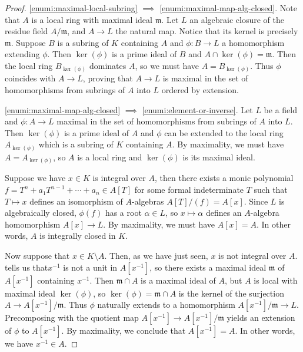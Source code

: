 \begin{proof}
\ref{enumi:maximal-local-subring} $\implies$ \ref{enumi:maximal-map-alg-closed}. Note that $A$ is a local ring with maximal ideal $\mathfrak{m}$. Let $L$ an algebraic closure of the residue field $A/\mathfrak{m}$, and $A \to L$ the natural map. Notice that its kernel is precisely $\mathfrak{m}$. Suppose $B$ is a subring of $K$ containing $A$ and $\phi : B \to L$ a homomorphism extending $\phi$. Then $\ker(\phi)$ is a prime ideal of $B$ and $A \cap \ker(\phi) = \mathfrak{m}$. Then the local ring $B_{\ker(\phi)}$ dominates $A$, so we must have $A = B_{\ker(\phi)}$. Thus $\phi$ coincides with $A \to L$, proving that $A \to L$ is maximal in the set of homomorphisms from subrings of $A$ into $L$ ordered by extension. 

\medskip
\noindent
\ref{enumi:maximal-map-alg-closed} $\implies$ \ref{enumi:element-or-inverse}. Let $L$ be a field and $\phi : A \to L$ maximal in the set of homomorphisms from subrings of $A$ into $L$. Then $\ker(\phi)$ is a prime ideal of $A$ and $\phi$ can be extended to the local ring $A_{\ker(\phi)}$ which is a subring of $K$ containing $A$. By maximality, we must have  $A = A_{\ker(\phi)}$, so $A$ is a local ring and $\ker(\phi)$ is its maximal ideal. 

Suppose we have $x \in K$ is integral over $A$, then there exists a monic polynomial $f = T^n + a_{1}T^{n-1} + \dotsb + a_n \in A[T]$ for some formal indeterminate $T$ such that $T \mapsto x$ defines an isomorphism of $A$-algebras $A[T]/(f) = A[x]$. Since $L$ is algebraically closed, $\phi(f)$ has a root $\alpha \in L$, so $x \mapsto \alpha$ defines an $A$-algebra homomorphism $A[x] \to L$. By maximality, we must have $A[x] = A$. In other words, $A$ is integrally closed in $K$. 

Now suppose that $x \in K \setminus A$. Then, as we have just seen, $x$ is not integral over $A$.  tells us that$x^{-1}$ is not a unit in $A[x^{-1}]$, so there exists a maximal ideal $\mathfrak{m}$ of $A[x^{-1}]$ containing $x^{-1}$. Then $\mathfrak{m} \cap A$ is a maximal ideal of $A$, but $A$ is local with maximal ideal $\ker(\phi)$, so $\ker(\phi) = \mathfrak{m} \cap A$ is the kernel of the surjection $A \to A[x^{-1}]/\mathfrak{m}$. Thus $\phi$ naturally extends to a homomorphism $A[x^{-1}]/\mathfrak{m} \to L$. Precomposing with the quotient map $A[x^{-1}] \to A[x^{-1}]/\mathfrak{m}$ yields an extension of $\phi$ to $A[x^{-1}]$. By maximality, we conclude that $A[x^{-1}] = A$. In other words, we have $x^{-1} \in A$. 



\end{proof}
